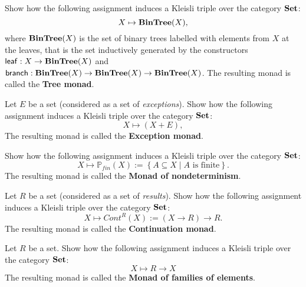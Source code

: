 \begin{exer}\label{exer:kleisli_triple_bintree} Show how the following assignment induces a Kleisli triple over the category $\mathbf{Set}$:
\[
X\mapsto \mathbf{BinTree}(X),
\]
where $\mathbf{BinTree}(X)$ is the set of binary trees labelled with elements from $X$ at the leaves, that is the set inductively generated by the constructors $\mathsf{leaf}: X\to \mathbf{BinTree}(X)$ and $\mathsf{branch} : \mathbf{BinTree}(X)\to \mathbf{BinTree}(X)\to \mathbf{BinTree}(X)$.
The resulting monad is called the \textbf{Tree monad}.
\end{exer}



\begin{exer}\label{exer:kleisli_triple_maybe} Let $E$ be a set (considered as a set of \textit{exceptions}). Show how the following assignment induces a Kleisli triple over the category $\mathbf{Set}$:
\[
X\mapsto (X + E),
\]
The resulting monad is called the \textbf{Exception monad}.
\end{exer}



\begin{exer}\label{exer:kleisli_triple_nondeterminism} Show how the following assignment induces a Kleisli triple over the category $\mathbf{Set}$:
\[
X\mapsto \mathbb{P}_{fin}(X) := \left\{A\subseteq X \mid  A \text{ is finite}\right\}.
\]
The resulting monad is called the \textbf{Monad of nondeterminism}.
\end{exer}


\begin{exer}\label{exer:kleisli_triple_continuation} Let $R$ be a set (considered as a set of \textit{results}). Show how the following assignment induces a Kleisli triple over the category $\mathbf{Set}$:
\[
X\mapsto Cont^R(X) := (X \to R) \to R.
\]
The resulting monad is called the \textbf{Continuation monad}.
\end{exer}


\begin{exer}\label{exer:kleisli_triple_familiesofelements} Let $R$ be a set. Show how the following assignment induces a Kleisli triple over the category $\mathbf{Set}$: 
\[
X \mapsto R \to X
\]
The resulting monad is called the \textbf{Monad of families of elements}.

\end{exer}



